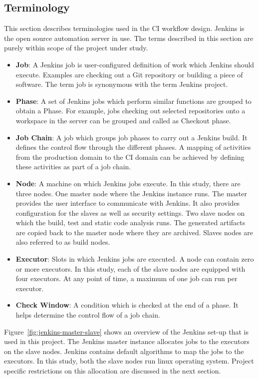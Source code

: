 \documentclass[12pt, a4paper, titlepage]{scrartcl}
\begin{document}
\subsection{Terminology}
This section describes terminologies used in the CI workflow design. Jenkins is the open source automation server in use. The terms described in this section are purely within scope of the project under study. 
\begin{itemize}
\item \textbf{Job}: A Jenkins job is user-configured definition of work which Jenkins should execute. Examples are checking out a Git repository or building a piece of software. The term job is synonymous with the term Jenkins project. 
\item \textbf{Phase}: A set of Jenkins jobs which perform similar functions are grouped to obtain a Phase. For example, jobs checking out selected repositories onto a workspace in the server can be grouped and called as Checkout phase. 
\item \textbf{Job Chain}: A job which groups job phases to carry out a Jenkins build. It defines the control flow through the different phases. A mapping of activities from the production domain to the CI domain can be achieved by defining these activities as part of a job chain.  
\item \textbf{Node}: A machine on which Jenkins jobs execute. In this study, there are three nodes. One master node where the Jenkins instance runs. The master provides the user interface to communicate with Jenkins. It also provides configuration for the slaves as well as security settings. Two slave nodes on which the build, test and static code analysis runs. The generated artifacts are copied back to the master node where they are archived. Slaves nodes are also referred to as build nodes. 
\item \textbf{Executor}: Slots in which Jenkins jobs are executed. A node can contain zero or more executors. In this study, each of the slave nodes are equipped with four executors. At any point of time, a maximum of one job can run per executor.
\item \textbf{Check Window}: A condition which is checked at the end of a phase. It helps determine the control flow of a job chain. 
\end{itemize}
\par Figure~\ref{fig:jenkins-master-slave} shows an overview of the Jenkins set-up that is used in this project. The Jenkins master instance allocates jobs to the executors on the slave nodes. Jenkins contains default algorithms to map the jobs to the executors. In this study, both the slave nodes run linux operating system. Project specific restrictions on this allocation are discussed in the next section.
\end{document}
